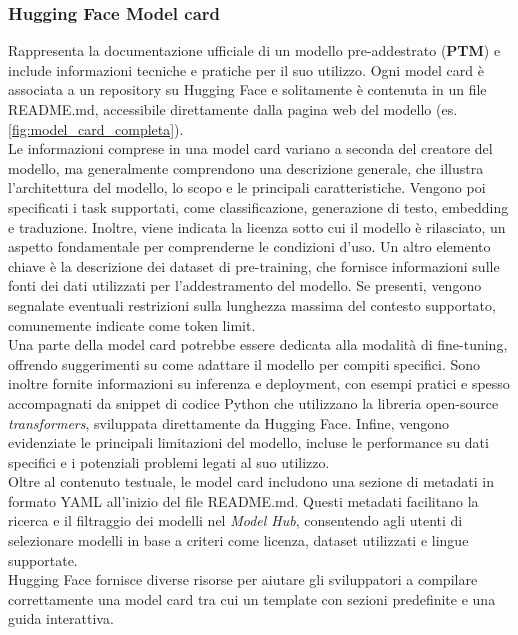 \documentclass{article}
\begin{document}
\subsubsection{Hugging Face Model card} 
Rappresenta la documentazione ufficiale di un modello pre-addestrato (\textbf{PTM})  e include informazioni tecniche e pratiche per il suo utilizzo\cite{huggingface_model_cards}. Ogni model card è associata a un repository su Hugging Face e solitamente è contenuta in un file README.md, accessibile direttamente dalla pagina web del modello (es. \cite{all-MiniLM-L6-v2} \ref{fig:model_card_completa}).\\
Le informazioni comprese in una model card variano a seconda del creatore del modello, ma generalmente comprendono una descrizione generale, che illustra l'architettura del modello, lo scopo e le principali caratteristiche. Vengono poi specificati i task supportati, come classificazione, generazione di testo, embedding e traduzione. Inoltre, viene indicata la licenza sotto cui il modello è rilasciato, un aspetto fondamentale per comprenderne le condizioni d'uso. Un altro elemento chiave è la descrizione dei dataset di pre-training, che fornisce informazioni sulle fonti dei dati utilizzati per l'addestramento del modello. Se presenti, vengono segnalate eventuali restrizioni sulla lunghezza massima del contesto supportato, comunemente indicate come token limit.\\
Una parte della model card potrebbe essere dedicata alla modalità di fine-tuning, offrendo suggerimenti su come adattare il modello per compiti specifici. Sono inoltre fornite informazioni su inferenza e deployment, con esempi pratici e spesso accompagnati da snippet di codice Python che utilizzano la libreria open-source \textit{transformers}\cite{wolf-etal-2020-transformers}, sviluppata direttamente da Hugging Face. Infine, vengono evidenziate le principali limitazioni del modello, incluse le performance su dati specifici e i potenziali problemi legati al suo utilizzo.\\
Oltre al contenuto testuale, le model card includono una sezione di metadati in formato YAML all'inizio del file README.md. Questi metadati facilitano la ricerca e il filtraggio dei modelli nel \textit{Model Hub}, consentendo agli utenti di selezionare modelli in base a criteri come licenza, dataset utilizzati e lingue supportate.\\
Hugging Face fornisce diverse risorse per aiutare gli sviluppatori a compilare correttamente una model card tra cui un template con sezioni predefinite e una guida interattiva.\\
\end{document}
